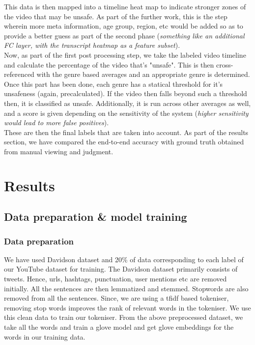 \documentclass{article}[A4]
\begin{document}
This data is then mapped into a timeline heat map to indicate stronger zones of the video that may be unsafe. As part of the further work, this is the step wherein more meta information, age group, region, etc would be added so as to provide a better guess as part of the second phase (\textit{something like an additional FC layer, with the transcript heatmap as a feature subset}). \\

Now, as part of the first post processing step, we take the labeled video timeline and calculate the percentage of the video that's "unsafe". This is then cross-referenced with the genre based averages and an appropriate genre is determined. Once this part has been done, each genre has a statical threshold for it's unsafeness (again, precalculated). If the video then falls beyond such a threshold then, it is classified as unsafe. Additionally, it is run across other averages as well, and a score is given depending on the sensitivity of the system (\textit{higher sensitivity would lead to more false positives}). \\

These are then the final labels that are taken into account. As part of the results section, we have compared the end-to-end accuracy with ground truth obtained from manual viewing and judgment.

\section{Results}

\subsection{Data preparation \& model training}
\subsubsection{Data preparation}
We have used Davidson dataset and 20\% of data corresponding to each label of our YouTube dataset for training. The Davidson dataset primarily consists of tweets. Hence, urls, hashtags, punctuation, user mentions etc are removed initially.
 All the sentences are then lemmatized and stemmed. Stopwords are also removed from all the sentences. Since, we are using a tfidf based tokeniser, removing stop words improves the rank of relevant words in the tokeniser. We use this clean data to train our tokeniser.
 From the above preprocessed dataset, we take all the words and train a glove model and get glove embeddings for the words in our training data. 
\end{document}
